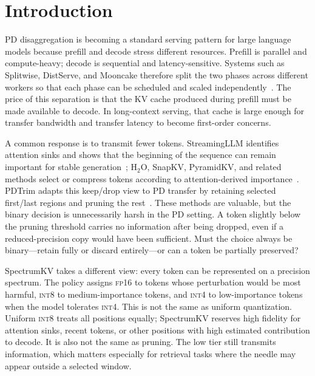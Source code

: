 \documentclass[11pt]{article}
\newcommand{\method}{SpectrumKV}
\newcommand{\fp}{\textsc{fp16}}
\newcommand{\intviii}{\textsc{int8}}
\newcommand{\intiv}{\textsc{int4}}
\theoremstyle{plain}
\theoremstyle{definition}
\begin{document}
\section{Introduction}
\label{sec:intro}

PD disaggregation is becoming a standard serving pattern for large language models because prefill and decode stress different resources.  Prefill is parallel and compute-heavy; decode is sequential and latency-sensitive.  Systems such as Splitwise, DistServe, and Mooncake therefore split the two phases across different workers so that each phase can be scheduled and scaled independently~\citep{splitwise,distserve,mooncake}.  The price of this separation is that the KV cache produced during prefill must be made available to decode.  In long-context serving, that cache is large enough for transfer bandwidth and transfer latency to become first-order concerns.

A common response is to transmit fewer tokens.  StreamingLLM identifies attention sinks and shows that the beginning of the sequence can remain important for stable generation~\citep{streamingllm}; H$_2$O, SnapKV, PyramidKV, and related methods select or compress tokens according to attention-derived importance~\citep{h2o,snapkv,pyramidkv,dynamickv}.  PDTrim adapts this keep/drop view to PD transfer by retaining selected first/last regions and pruning the rest~\citep{pdtrim}.  These methods are valuable, but the binary decision is unnecessarily harsh in the PD setting.  A token slightly below the pruning threshold carries no information after being dropped, even if a reduced-precision copy would have been sufficient.  Must the choice always be binary---retain fully or discard entirely---or can a token be partially preserved?

\method{} takes a different view: every token can be represented on a precision spectrum.  The policy assigns \fp{} to tokens whose perturbation would be most harmful, \intviii{} to medium-importance tokens, and \intiv{} to low-importance tokens when the model tolerates \intiv{}.  This is not the same as uniform quantization.  Uniform \intviii{} treats all positions equally; \method{} reserves high fidelity for attention sinks, recent tokens, or other positions with high estimated contribution to decode.  It is also not the same as pruning.  The low tier still transmits information, which matters especially for retrieval tasks where the needle may appear outside a selected window.
\end{document}
